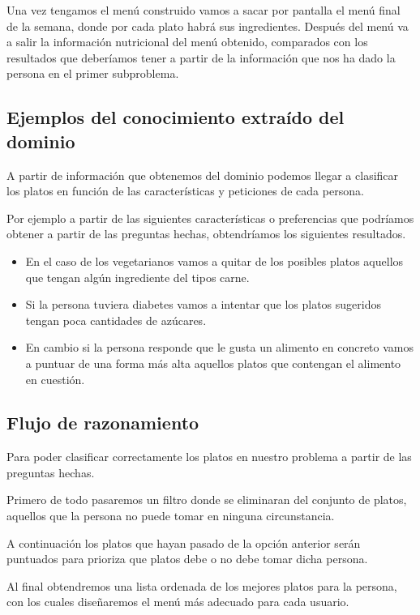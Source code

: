 \documentclass[11]{article}
\begin{document}
Una vez tengamos el menú construido vamos a sacar por pantalla el menú final de la semana, donde por cada plato habrá sus ingredientes.
Después del menú va a salir la información nutricional del menú obtenido, comparados con los resultados que deberíamos tener a partir de la información que nos ha dado la persona en el primer subproblema.

\subsection{Ejemplos del conocimiento extraído del dominio}
A partir de información que obtenemos del dominio podemos llegar a clasificar los platos en función de las características y peticiones de cada persona.

Por ejemplo a partir de las siguientes características o preferencias que podríamos obtener a partir de las preguntas hechas, obtendríamos los siguientes resultados.

\begin{itemize}
	\item En el caso de los vegetarianos vamos a quitar de los posibles platos aquellos que tengan algún ingrediente del tipos carne.
	\item Si la persona tuviera diabetes vamos a intentar que los platos sugeridos tengan poca cantidades de azúcares.
	\item En cambio si la persona responde que le gusta un alimento en concreto vamos a puntuar de una forma más alta aquellos platos que contengan el alimento en cuestión.
\end{itemize}

\subsection{Flujo de razonamiento}

Para poder clasificar correctamente los platos en nuestro problema a partir de las preguntas hechas.

Primero de todo pasaremos un filtro donde se eliminaran del conjunto de platos, aquellos que la persona no puede tomar en ninguna circunstancia.

A continuación los platos que hayan pasado de la opción anterior serán puntuados para prioriza que platos debe o no debe tomar dicha persona.

Al final obtendremos una lista ordenada de los mejores platos para la persona, con los cuales diseñaremos el menú más adecuado para cada usuario. 
\end{document}
